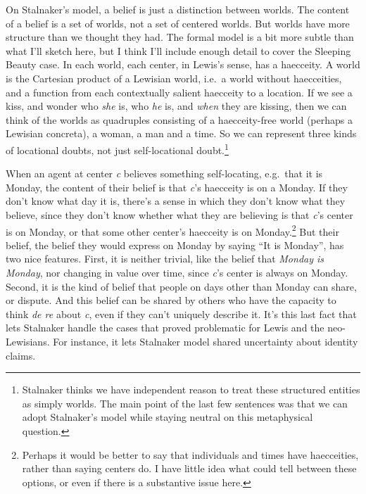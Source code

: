 \documentclass[
  11pt,
  letterpaper,
  DIV=11,
  numbers=noendperiod,
  twoside]{scrartcl}
\begin{document}
On Stalnaker's model, a belief is just a distinction between worlds. The
content of a belief is a set of worlds, not a set of centered worlds.
But worlds have more structure than we thought they had. The formal
model is a bit more subtle than what I'll sketch here, but I think I'll
include enough detail to cover the Sleeping Beauty case. In each world,
each center, in Lewis's sense, has a haecceity. A world is the Cartesian
product of a Lewisian world, i.e.~a world without haecceities, and a
function from each contextually salient haecceity to a location. If we
see a kiss, and wonder who \emph{she} is, who \emph{he} is, and
\emph{when} they are kissing, then we can think of the worlds as
quadruples consisting of a haecceity-free world (perhaps a Lewisian
concreta), a woman, a man and a time. So we can represent three kinds of
locational doubts, not just self-locational doubt.\footnote{Stalnaker
  thinks we have independent reason to treat these structured entities
  as simply worlds. The main point of the last few sentences was that we
  can adopt Stalnaker's model while staying neutral on this metaphysical
  question.}

When an agent at center \emph{c} believes something self-locating,
e.g.~that it is Monday, the content of their belief is that \emph{c}'s
haecceity is on a Monday. If they don't know what day it is, there's a
sense in which they don't know what they believe, since they don't know
whether what they are believing is that \emph{c}'s center is on Monday,
or that some other center's haecceity is on Monday.\footnote{Perhaps it
  would be better to say that individuals and times have haecceities,
  rather than saying centers do. I have little idea what could tell
  between these options, or even if there is a substantive issue here.}
But their belief, the belief they would express on Monday by saying ``It
is Monday'', has two nice features. First, it is neither trivial, like
the belief that \emph{Monday is Monday}, nor changing in value over
time, since \emph{c}'s center is always on Monday. Second, it is the
kind of belief that people on days other than Monday can share, or
dispute. And this belief can be shared by others who have the capacity
to think \emph{de re} about \emph{c}, even if they can't uniquely
describe it. It's this last fact that lets Stalnaker handle the cases
that proved problematic for Lewis and the neo-Lewisians. For instance,
it lets Stalnaker model shared uncertainty about identity claims.
\end{document}
